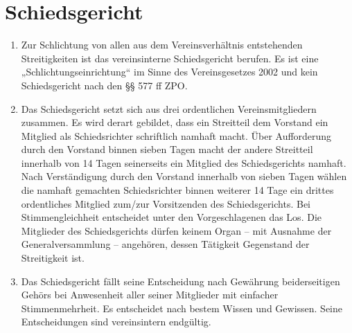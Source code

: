 \documentclass[a4paper,12pt]{article}
\begin{document}
\section{Schiedsgericht} %
\begin{enumerate}

\item Zur Schlichtung von allen aus dem Vereinsverhältnis entstehenden Streitigkeiten ist das vereinsinterne Schiedsgericht berufen. Es ist eine „Schlichtungseinrichtung“ im Sinne des Vereinsgesetzes 2002 und kein Schiedsgericht nach den §§ 577 ff ZPO.

\item Das Schiedsgericht setzt sich aus drei ordentlichen Vereinsmitgliedern zusammen.
Es wird derart gebildet, dass ein Streitteil dem Vorstand ein Mitglied als Schiedsrichter schriftlich namhaft macht.
Über Aufforderung durch den Vorstand binnen sieben Tagen macht der andere Streitteil innerhalb von 14 Tagen seinerseits ein Mitglied des Schiedsgerichts namhaft.
Nach Verständigung durch den Vorstand innerhalb von sieben Tagen wählen die namhaft gemachten Schiedsrichter binnen weiterer 14 Tage ein drittes ordentliches Mitglied zum/zur Vorsitzenden des Schiedsgerichts.
Bei Stimmengleichheit entscheidet unter den Vorgeschlagenen das Los. Die Mitglieder des Schiedsgerichts dürfen keinem Organ – mit Ausnahme der Generalversammlung – angehören, dessen Tätigkeit Gegenstand der Streitigkeit ist.

\item Das Schiedsgericht fällt seine Entscheidung nach Gewährung beiderseitigen Gehörs bei Anwesenheit aller seiner Mitglieder mit einfacher Stimmenmehrheit.
Es entscheidet nach bestem Wissen und Gewissen. Seine Entscheidungen sind vereinsintern endgültig.

\end{enumerate}
\end{document}

